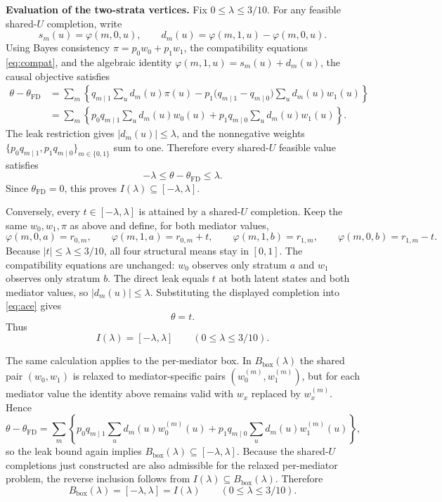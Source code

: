 \documentclass[11pt]{article}
\theoremstyle{definition}
\theoremstyle{plain}
\theoremstyle{remark}
\begin{document}
\textbf{Evaluation of the two-strata vertices.} Fix \(0\le\lambda\le3/10\). For
any feasible shared-\(U\) completion, write
\[
  s_m(u)=\varphi(m,0,u),\qquad d_m(u)=\varphi(m,1,u)-\varphi(m,0,u).
\]
Using Bayes consistency \(\pi=p_0w_0+p_1w_1\), the compatibility equations
\eqref{eq:compat}, and the algebraic identity
\(\varphi(m,1,u)=s_m(u)+d_m(u)\), the causal objective satisfies
\[
\begin{aligned}
  \theta-\theta_{\mathrm{FD}}
  &=\sum_m\left\{q_{m\mid1}\sum_u d_m(u)\pi(u)
       -p_1\bigl(q_{m\mid1}-q_{m\mid0}\bigr)\sum_u d_m(u)w_1(u)\right\} \\
  &=\sum_m\left\{
       p_0q_{m\mid1}\sum_u d_m(u)w_0(u)
       +p_1q_{m\mid0}\sum_u d_m(u)w_1(u)\right\}.
\end{aligned}
\]
The leak restriction gives \(|d_m(u)|\le\lambda\), and the nonnegative weights
\(\{p_0q_{m\mid1},p_1q_{m\mid0}\}_{m\in\{0,1\}}\) sum to one. Therefore every
shared-\(U\) feasible value satisfies
\[
  -\lambda\le\theta-\theta_{\mathrm{FD}}\le\lambda.
\]
Since \(\theta_{\mathrm{FD}}=0\), this proves \(I(\lambda)\subseteq[-\lambda,\lambda]\).

Conversely, every \(t\in[-\lambda,\lambda]\) is attained by a shared-\(U\)
completion. Keep the same \(w_0,w_1,\pi\) as above and define, for both mediator
values,
\[
  \varphi(m,0,a)=r_{0,m},\qquad
  \varphi(m,1,a)=r_{0,m}+t,\qquad
  \varphi(m,1,b)=r_{1,m},\qquad
  \varphi(m,0,b)=r_{1,m}-t.
\]
Because \(|t|\le\lambda\le3/10\), all four structural means stay in \([0,1]\).
The compatibility equations are unchanged: \(w_0\) observes only stratum \(a\)
and \(w_1\) observes only stratum \(b\). The direct leak equals \(t\) at both
latent states and both mediator values, so \(|d_m(u)|\le\lambda\). Substituting
the displayed completion into \eqref{eq:ace} gives
\[
  \theta=t.
\]
Thus
\[
  I(\lambda)=[-\lambda,\lambda]\qquad(0\le\lambda\le3/10).
\]

The same calculation applies to the per-mediator box. In
\(B_{\mathrm{box}}(\lambda)\) the shared pair \((w_0,w_1)\) is relaxed to
mediator-specific pairs \((w_0^{(m)},w_1^{(m)})\), but for each mediator value
the identity above remains valid with \(w_x\) replaced by \(w_x^{(m)}\). Hence
\[
  \theta-\theta_{\mathrm{FD}}
  =\sum_m\left\{
       p_0q_{m\mid1}\sum_u d_m(u)w_0^{(m)}(u)
       +p_1q_{m\mid0}\sum_u d_m(u)w_1^{(m)}(u)\right\},
\]
so the leak bound again implies \(B_{\mathrm{box}}(\lambda)\subseteq[-\lambda,\lambda]\).
Because the shared-\(U\) completions just constructed are also admissible for the
relaxed per-mediator problem, the reverse inclusion follows from
\(I(\lambda)\subseteq B_{\mathrm{box}}(\lambda)\). Therefore
\[
  B_{\mathrm{box}}(\lambda)=[-\lambda,\lambda]=I(\lambda)
  \qquad(0\le\lambda\le3/10).
\]
\end{document}
